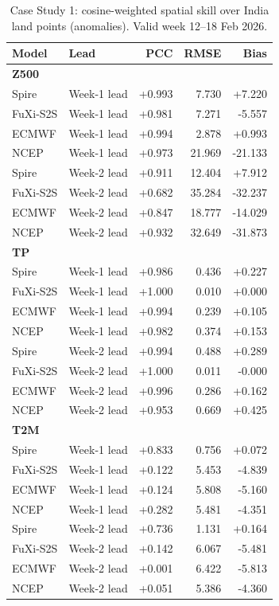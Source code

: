 \begin{table}[t]\centering
\caption{Case Study 1: cosine-weighted spatial skill over India land points (anomalies). Valid week 12--18 Feb 2026.}
\label{tab:case1_skill}
\begin{tabular}{llrrr}
\hline
Model & Lead & PCC & RMSE & Bias \\ \hline
\multicolumn{5}{l}{\textbf{Z500}} \\ \hline
Spire & Week-1 lead & +0.993 & 7.730 & +7.220 \\
FuXi-S2S & Week-1 lead & +0.981 & 7.271 & -5.557 \\
ECMWF & Week-1 lead & +0.994 & 2.878 & +0.993 \\
NCEP & Week-1 lead & +0.973 & 21.969 & -21.133 \\
Spire & Week-2 lead & +0.911 & 12.404 & +7.912 \\
FuXi-S2S & Week-2 lead & +0.682 & 35.284 & -32.237 \\
ECMWF & Week-2 lead & +0.847 & 18.777 & -14.029 \\
NCEP & Week-2 lead & +0.932 & 32.649 & -31.873 \\
\hline
\multicolumn{5}{l}{\textbf{TP}} \\ \hline
Spire & Week-1 lead & +0.986 & 0.436 & +0.227 \\
FuXi-S2S & Week-1 lead & +1.000 & 0.010 & +0.000 \\
ECMWF & Week-1 lead & +0.994 & 0.239 & +0.105 \\
NCEP & Week-1 lead & +0.982 & 0.374 & +0.153 \\
Spire & Week-2 lead & +0.994 & 0.488 & +0.289 \\
FuXi-S2S & Week-2 lead & +1.000 & 0.011 & -0.000 \\
ECMWF & Week-2 lead & +0.996 & 0.286 & +0.162 \\
NCEP & Week-2 lead & +0.953 & 0.669 & +0.425 \\
\hline
\multicolumn{5}{l}{\textbf{T2M}} \\ \hline
Spire & Week-1 lead & +0.833 & 0.756 & +0.072 \\
FuXi-S2S & Week-1 lead & +0.122 & 5.453 & -4.839 \\
ECMWF & Week-1 lead & +0.124 & 5.808 & -5.160 \\
NCEP & Week-1 lead & +0.282 & 5.481 & -4.351 \\
Spire & Week-2 lead & +0.736 & 1.131 & +0.164 \\
FuXi-S2S & Week-2 lead & +0.142 & 6.067 & -5.481 \\
ECMWF & Week-2 lead & +0.001 & 6.422 & -5.813 \\
NCEP & Week-2 lead & +0.051 & 5.386 & -4.360 \\
\hline
\end{tabular}
\end{table}
